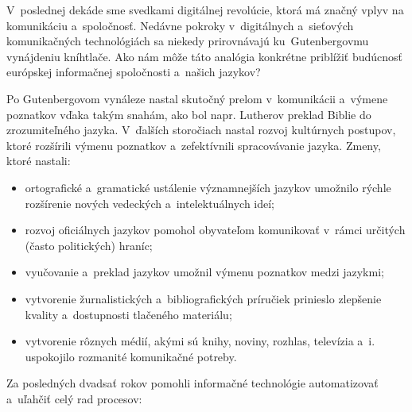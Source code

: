 \clearpage


\begin{multicols}{2}

V~poslednej dekáde sme svedkami digitálnej revolúcie, ktorá má značný vplyv na komunikáciu a~spoločnosť. Nedávne pokroky v~digitálnych a~sieťových komunikačných technológiách sa niekedy prirovnávajú ku~Gutenbergovmu vynájdeniu kníhtlače. Ako nám môže táto analógia konkrétne priblížiť budúcnosť európskej informačnej spoločnosti a~našich jazykov?


Po Gutenbergovom vynáleze nastal skutočný prelom v~komunikácii
a~výmene poznatkov vďaka takým snahám, ako bol napr. Lutherov
preklad Biblie do zrozumiteľného jazyka. V~ďalších storočiach
nastal rozvoj kultúrnych postupov, ktoré rozšírili
výmenu poznatkov a~zefektívnili spracovávanie jazyka. Zmeny,
ktoré nastali:

\begin{itemize}
\item ortografické a~gramatické ustálenie významnejších jazykov umožnilo rýchle rozšírenie nových vedeckých a~intelektuálnych ideí;
\item rozvoj oficiálnych jazykov pomohol obyvateľom komunikovať v~rámci určitých (často politických) hraníc;
\item vyučovanie a~preklad jazykov umožnil výmenu poznatkov medzi jazykmi;
\item vytvorenie žurnalistických a~bibliografických príručiek prinieslo zlepšenie kvality a~dostupnosti tlačeného materiálu;
\item vytvorenie rôznych médií, akými sú knihy, noviny, rozhlas, televízia a~i. uspokojilo rozmanité komunikačné potreby.
\end{itemize}

Za posledných dvadsať rokov pomohli informačné technológie automatizovať a~uľahčiť celý rad procesov:


\end{multicols}
